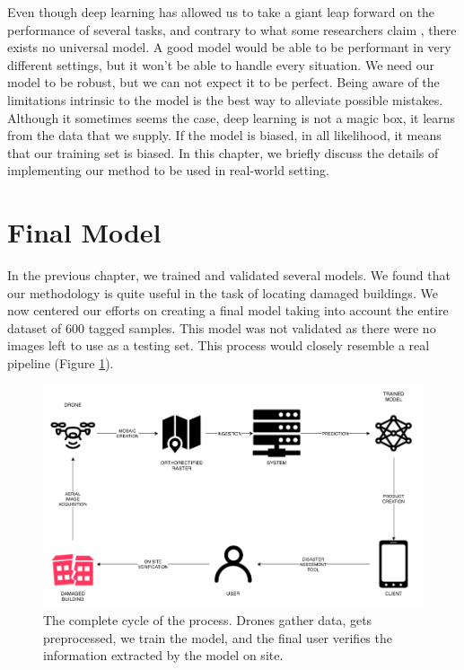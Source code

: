 Even though deep learning has allowed us to take a giant leap forward on the performance of several tasks, and contrary to what some researchers claim \cite{DBLP:journals/corr/KaiserGSVPJU17}, there exists no universal model. A good model would be able to be performant in very different settings, but it won't be able to handle every situation. We need our model to be robust, but we can not expect it to be perfect. Being aware of the limitations intrinsic to the model is the best way to alleviate possible mistakes. Although it sometimes seems the case, deep learning is not a magic box, it learns from the data that we supply. If the model is biased, in all likelihood, it means that our training set is biased. In this chapter, we briefly discuss the details of implementing our method to be used in real-world setting.\\

\section{Final Model}

In the previous chapter, we trained and validated several models. We found that our methodology is quite useful in the task of locating damaged buildings. We now centered our efforts on creating a final model taking into account the entire dataset of 600 tagged samples. This model was not validated as there were no images left to use as a testing set. This process would closely resemble a real pipeline (Figure \ref{fig:process}).\\


\begin{figure}[!h]
  \centering
  \includegraphics[width=1\textwidth]{images/process-diagram.png}
  \caption{The complete cycle of the process. Drones gather data, gets preprocessed, we train the model, and the final user verifies the information extracted by the model on site.}
  \label{fig:process}
\end{figure}


